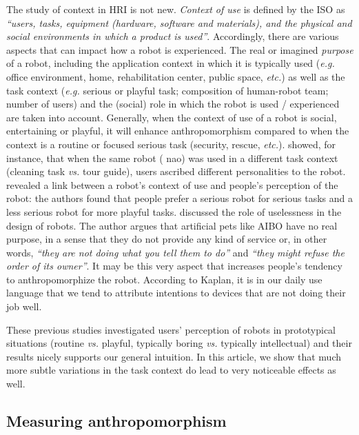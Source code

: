 \documentclass[lettersize, noapacite, twoside, HRI]{apa_HRI}
\newcommand{\eg}{\textit{e.g.}\xspace}
\newcommand{\etc}{\textit{etc.}\xspace}
\newcommand{\vs}{\textit{vs.}\xspace}
\begin{document}
The study of context in HRI is not new. \textit{Context of use} is defined by
the ISO as \textit{``users, tasks, equipment (hardware, software and materials),
and the physical and social environments in which a product is used''}.
Accordingly, there are various aspects that can impact how a robot is
experienced. The real or imagined \textit{purpose} of a robot, including the
application context in which it is typically used (\eg office environment, home,
rehabilitation center, public space, \etc) as well as the task context (\eg
serious or playful task; composition of human-robot team; number of users) and
the (social) role in which the robot is used / experienced are taken into
account. Generally, when the context of use of a robot is social, entertaining
or playful, it will enhance anthropomorphism compared to when the context is a
routine or focused serious task (security, rescue, \etc).
\citet{joosse_what_2013} showed, for instance, that when the same robot ({\sc
nao}) was used in a different task context (cleaning task \vs tour guide), users
ascribed different personalities to the robot. \citet{goetz_cooperation_2002}
revealed a link between a robot's context of use and people's perception of the
robot: the authors found that people prefer a serious robot for serious tasks
and a less serious robot for more playful tasks. \citet{kaplan_free_2000}
discussed the role of uselessness in the design of robots. The author argues
that artificial pets like AIBO have no real purpose, in a sense that they do not
provide any kind of service or, in other words, \textit{``they are not doing
what you tell them to do''} and \textit{``they might refuse the order of its
owner''}. It may be this very aspect that increases people's tendency to
anthropomorphize the robot. According to Kaplan, it is in our daily use language
that we tend to attribute intentions to devices that are not doing their job
well.

These previous studies investigated users' perception of robots in
prototypical situations (routine \vs playful, typically boring \vs typically
intellectual) and their results nicely supports our general intuition.
In this article, we show that much more subtle variations in the task context do
lead to very noticeable effects as well.

\subsection*{Measuring anthropomorphism}
\end{document}
